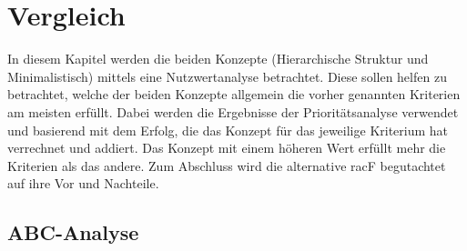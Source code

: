 \chapter{Vergleich}
\label{ch:chapter05}
In diesem Kapitel werden die beiden Konzepte (Hierarchische Struktur und Minimalistisch) mittels eine Nutzwertanalyse betrachtet.
Diese sollen helfen zu betrachtet, welche der beiden Konzepte allgemein die vorher genannten Kriterien am meisten erfüllt.
Dabei werden die Ergebnisse der Prioritätsanalyse verwendet und basierend mit dem Erfolg, die das Konzept für das jeweilige Kriterium hat verrechnet und addiert.
Das Konzept mit einem höheren Wert erfüllt mehr die Kriterien als das andere.
Zum Abschluss wird die alternative racF begutachtet auf ihre Vor und Nachteile.

\section{ABC-Analyse}
\label{sec:chapter05:Anal}

